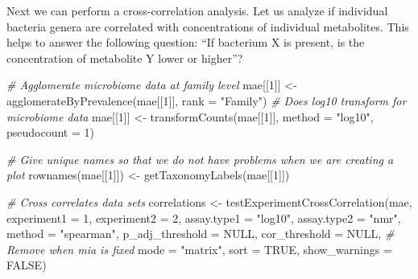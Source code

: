 \documentclass[
]{book}
\newenvironment{Shaded}{\begin{snugshade}}{\end{snugshade}}
\newcommand{\AttributeTok}[1]{\textcolor[rgb]{0.77,0.63,0.00}{#1}}
\newcommand{\CommentTok}[1]{\textcolor[rgb]{0.56,0.35,0.01}{\textit{#1}}}
\newcommand{\ConstantTok}[1]{\textcolor[rgb]{0.00,0.00,0.00}{#1}}
\newcommand{\DecValTok}[1]{\textcolor[rgb]{0.00,0.00,0.81}{#1}}
\newcommand{\FunctionTok}[1]{\textcolor[rgb]{0.00,0.00,0.00}{#1}}
\newcommand{\NormalTok}[1]{#1}
\newcommand{\OtherTok}[1]{\textcolor[rgb]{0.56,0.35,0.01}{#1}}
\newcommand{\StringTok}[1]{\textcolor[rgb]{0.31,0.60,0.02}{#1}}
\begin{document}
Next we can perform a cross-correlation analysis. Let us analyze if
individual bacteria genera are correlated with concentrations of
individual metabolites. This helps to answer the following question: ``If
bacterium X is present, is the concentration of metabolite Y lower or higher''?

\begin{Shaded}
\begin{Highlighting}[]
\CommentTok{\# Agglomerate microbiome data at family level}
\NormalTok{mae[[}\DecValTok{1}\NormalTok{]] }\OtherTok{\textless{}{-}} \FunctionTok{agglomerateByPrevalence}\NormalTok{(mae[[}\DecValTok{1}\NormalTok{]], }\AttributeTok{rank =} \StringTok{"Family"}\NormalTok{)}
\CommentTok{\# Does log10 transform for microbiome data}
\NormalTok{mae[[}\DecValTok{1}\NormalTok{]] }\OtherTok{\textless{}{-}} \FunctionTok{transformCounts}\NormalTok{(mae[[}\DecValTok{1}\NormalTok{]], }\AttributeTok{method =} \StringTok{"log10"}\NormalTok{, }\AttributeTok{pseudocount =} \DecValTok{1}\NormalTok{)}

\CommentTok{\# Give unique names so that we do not have problems when we are creating a plot}
\FunctionTok{rownames}\NormalTok{(mae[[}\DecValTok{1}\NormalTok{]]) }\OtherTok{\textless{}{-}} \FunctionTok{getTaxonomyLabels}\NormalTok{(mae[[}\DecValTok{1}\NormalTok{]])}

\CommentTok{\# Cross correlates data sets}
\NormalTok{correlations }\OtherTok{\textless{}{-}} \FunctionTok{testExperimentCrossCorrelation}\NormalTok{(mae, }
                                               \AttributeTok{experiment1 =} \DecValTok{1}\NormalTok{,}
                                               \AttributeTok{experiment2 =} \DecValTok{2}\NormalTok{,}
                                               \AttributeTok{assay.type1 =} \StringTok{"log10"}\NormalTok{, }
                                               \AttributeTok{assay.type2 =} \StringTok{"nmr"}\NormalTok{,}
                                               \AttributeTok{method =} \StringTok{"spearman"}\NormalTok{, }
                                               \AttributeTok{p\_adj\_threshold =} \ConstantTok{NULL}\NormalTok{,}
                                               \AttributeTok{cor\_threshold =} \ConstantTok{NULL}\NormalTok{,}
                                               \CommentTok{\# Remove when mia is fixed}
                                               \AttributeTok{mode =} \StringTok{"matrix"}\NormalTok{,}
                                               \AttributeTok{sort =} \ConstantTok{TRUE}\NormalTok{,}
                                               \AttributeTok{show\_warnings =} \ConstantTok{FALSE}\NormalTok{)}
\end{Highlighting}
\end{Shaded}
\end{document}
